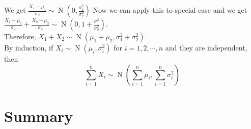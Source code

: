 \documentclass{huhtakm-template-book}
\DeclareMathOperator{\N}{N}
\begin{document}
\begin{proofing}
\begin{equation*}
        \end{equation*}
        We get $\frac{X_{1}-\mu_{1}}{\sigma_{2}}\sim\N\left(0,\frac{\sigma_{1}^{2}}{\sigma_{2}^{2}}\right)$ Now we can apply this to special case and we get $\frac{X_{1}-\mu_{1}}{\sigma_{2}}+\frac{X_{2}-\mu_{2}}{\sigma_{2}}\sim\N\left(0,1+\frac{\sigma_{1}^{2}}{\sigma_{2}^{2}}\right)$.\\
        Therefore, $X_{1}+X_{2}\sim\N(\mu_{1}+\mu_{2},\sigma_{1}^{2}+\sigma_{2}^{2})$.\\
        By induction, if $X_{i}\sim\N(\mu_{i},\sigma_{i}^{2})$ for $i=1,2,\cdots,n$ and they are independent, then
        \begin{equation*}
            \sum_{i=1}^{n}X_{i}\sim\N\left(\sum_{i=1}^{n}\mu_{i},\sum_{i=1}^{n}\sigma_{i}^{2}\right)
        \end{equation*}
    \end{proofing}

\chapter*{Summary}
\end{document}
